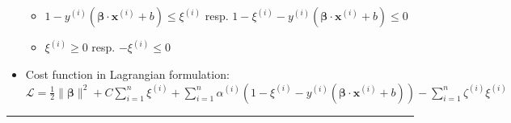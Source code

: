 \begin{itemize}
\begin{itemize}
        \item $1 - y^{(i)} (\boldsymbol{\beta} \cdot \boldsymbol{x}^{(i)} + b) \leq \xi^{(i)}$ resp. $1-\xi^{(i)} - y^{(i)} (\boldsymbol{\beta} \cdot \boldsymbol{x}^{(i)} + b) \leq 0$ 
        \item $\xi^{(i)} \geq 0$ resp. $-\xi^{(i)} \leq 0$
    \end{itemize}
    \item Cost function in Lagrangian formulation: $\mathcal{L} = \frac{1}{2} \| \boldsymbol{\beta} \|^2 + C \sum_{i=1}^n \xi^{(i)} + \sum_{i=1}^n \alpha^{(i)} (1 - \xi^{(i)} - y^{(i)} (\boldsymbol{\beta} \cdot \boldsymbol{x}^{(i)} + b)) - \sum_{i=1}^n \zeta^{(i)} \xi^{(i)}$
\end{itemize}

{\color{lightgray}\hrule height 0.001mm}

